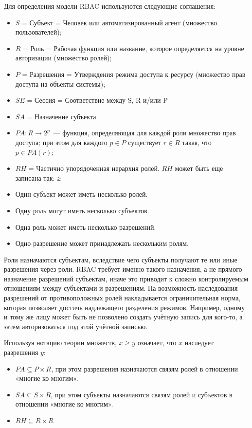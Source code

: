 Для определения модели RBAC используются следующие соглашения:
\begin{itemize}
\item $S$ = Субъект = Человек или автоматизированный агент (множество пользователей);
\item $R$ = Роль  = Рабочая функция или название, которое определяется на уровне авторизации (множество ролей);
\item $P$ = Разрешения = Утверждения режима доступа к ресурсу (множество прав доступа на объекты системы);
\item $SE$ = Сессия = Соответствие между S, R и/или P
\item $SA$ = Назначение субъекта
\item $PA: R \to 2^p$ — функция, определяющая для каждой роли множество прав доступа; при этом для каждого $p \in P$ существует $r \in R$ такая, что $p \in PA(r)$;
\item $RH$ = Частично упорядоченная иерархия ролей. $RH$ может быть еще записана так: ≥
\item Один субъект может иметь несколько ролей.
\item Одну роль могут иметь несколько субъектов.
\item Одна роль может иметь несколько разрешений.
\item Одно разрешение может принадлежать нескольким ролям.
\end{itemize}


Роли назначаются субъектам, вследствие чего субъекты получают те или иные разрешения через роли. RBAC требует именно такого назначения, а не прямого - назначение разрешений субъектам, иначе это приводит к сложно контролируемым отношениям между субъектами и разрешениям. На возможность наследования разрешений от противоположных ролей накладывается ограничительная норма, которая позволяет достичь надлежащего разделения режимов. Например, одному и тому же лицу может быть не позволено создать учётную запись для кого-то, а затем авторизоваться под этой учётной записью.

Используя нотацию теории множеств, $x ≥ y$ означает, что $x$ наследует разрешения $y$:
\begin{itemize}
\item $PA \subseteq P \times R$, при этом разрешения назначаются связям ролей в отношении «многие ко многим».
\item $SA \subseteq S \times R$, при этом субъекты назначаются связям ролей и субъектов в отношении «многие ко многим».
\item $RH \subseteq R \times R$
\end{itemize}

